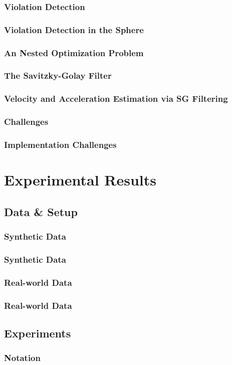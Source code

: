 \documentclass[hyperref={pdfpagelabels=false}]{beamer}
\begin{document}
\subsubsection*{Violation Detection}
\begin{frame} \frametitle{Violation Detection in the Sphere}\frametitle{An Nested Optimization Problem}

\end{frame}
\subsubsection*{The Savitzky-Golay Filter}
\begin{frame} \frametitle{Velocity and Acceleration Estimation via SG Filtering}

\end{frame}
\subsubsection*{Challenges}
\begin{frame} \frametitle{Implementation Challenges}

\end{frame}
\section{Experimental Results}
\subsection{Data \& Setup}
\subsubsection*{Synthetic Data}
\begin{frame} \frametitle{Synthetic Data}

\end{frame}
\subsubsection*{Real-world Data}
\begin{frame} \frametitle{Real-world Data}

\end{frame}
\subsection{Experiments}
\begin{frame} \frametitle{Notation}

\end{frame}
\end{document}
